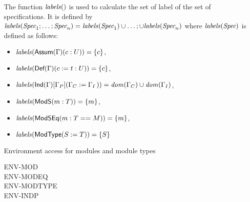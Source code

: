 The function $\mathit{labels}()$ is used to calculate the set of label of
the set of specifications. It is defined by
$\mathit{labels}(\textit{Spec}_1;\dots;\textit{Spec}_n)=\mathit{labels}(\textit{Spec}_1)\cup\dots;\cup\mathit{labels}(\textit{Spec}_n)$
where $\mathit{labels}(\textit{Spec})$ is defined as follows:
\begin{itemize}
\item $\mathit{labels}(\mbox{{\sf Assum}$(\Gamma)(c:U)$})=\{c\}$,
\item $\mathit{labels}(\mbox{{\sf Def}$(\Gamma)(c:=t:U)$})=\{c\}$,
\item
  $\lab{\Ind{\Gamma}{\Gamma_P}{\Gamma_C}{\Gamma_I}}=\dom{\Gamma_C}\cup\dom{\Gamma_I}$,
\item $\mathit{labels}({\sf ModS}({m}:{T}))=\{m\}$,
\item $\mathit{labels}({\sf ModSEq}({m}:{T}=={M}))=\{m\}$,
\item $\mathit{labels}({\sf ModType}({S}:={T}))=\{S\}$
\end{itemize}
Environment access for modules and module types
\begin{description}
\item[ENV-MOD]
\item[]
\item[ENV-MODEQ]
\item[ENV-MODTYPE]
\item[ENV-INDP]
\end{description}





